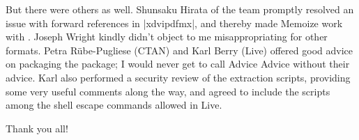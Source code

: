\documentclass[a4paper,11pt]{article}
\begin{document}
But there were others as well.  Shunsaku Hirata of the  team
promptly resolved an issue with forward references in |xdvipdfmx|, and thereby
made Memoize work with .  Joseph Wright kindly didn't object to
me misappropriating  for other formats.  Petra Rübe-Pugliese
(CTAN) and Karl Berry (Live) offered good advice on packaging the
package; I would never get to call Advice Advice without their advice.  Karl
also performed a security review of the extraction scripts, providing some very
useful comments along the way, and agreed to include the scripts among the
shell escape commands allowed in Live.

Thank you all!


\printindex
\end{document}
